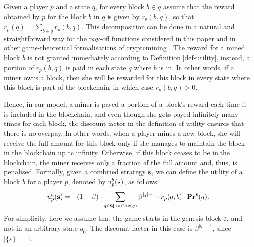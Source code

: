 Given a player $p$ and a state $q$, for every block $b \in q$ assume that the reward obtained by $p$ for the block $b$ in $q$ is given by $r_p(b,q)$, so that $r_p(q) = \sum_{b \in q} r_p(b,q)$. This decomposition can be done in a natural and straightforward way for the pay-off functions considered in this paper and in other game-theoretical formalisations of cryptomining \cite{mininggames:2016,koutsoupias2018blockchain}. 
The reward for a mined block $b$ 
is not granted immediately according to  Definition \ref{def-utility}, instead,
a portion of $r_p(b,q)$ is paid in each state $q$ where $b$ is in.
In other words, if a miner owns a block, then she will be rewarded for this block in every state where this block is part of the blockchain, in which case $r_p(b,q) > 0$. 

Hence, in our model, a miner is payed a portion of a block's reward each time it is included in the blockchain, and even though  she gets payed infinitely many times for each block, the 
discount factor in the definition of utility ensures that there is no overpay.
In other words, 
when a player mines a new block, she will receive the full amount for this block only if she manages to maintain the block in the blockchain up to infinity. Otherwise, if this block 
ceases to be in the blockchain, the miner receives only a fraction of the full amount and, thus, is penalised. Formally, given a combined strategy $\mathbf{s}$, we can define the utility of a block $b$ for a player $p$, denoted by $u_p^b(\mathbf{s})$,  as follows:
\begin{eqnarray*}
u_p^b(\mathbf{s}) & =  & (1 - \beta) \cdot  \sum_{q \in \mathbf{Q} \,:\, b \in \text{bc}(q)} \beta^{|q|-1} \cdot  r_p(q,b) \cdot \mathbf{Pr}^{\mathbf{s}}(q).
\end{eqnarray*}
For simplicity, here we assume that the game starts in the genesis block $\varepsilon$, and not in an arbitrary state $q_0$. The discount factor in this case is $\beta^{|q|-1}$, since $|\{\varepsilon\}|= 1$.  



